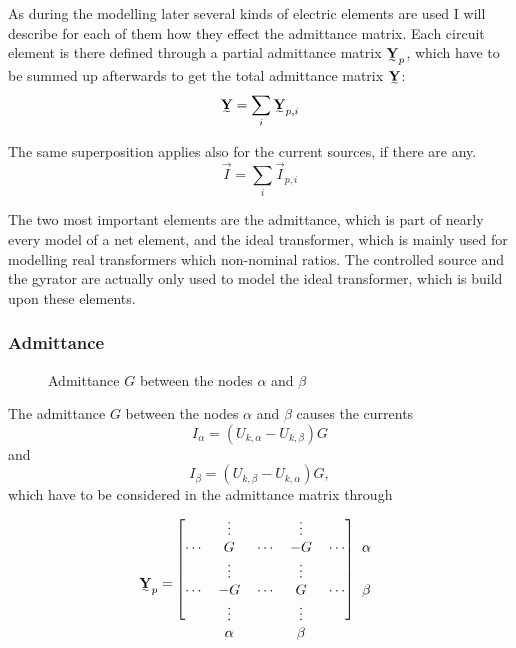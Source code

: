 As during the modelling later several kinds of electric elements are used I will describe for each of them how they effect the admittance matrix. Each circuit element is there defined through a partial admittance matrix $\mat Y_p$, which have to be summed up afterwards to get the total admittance matrix $\mat Y$:
\begin{equation}
	\mat Y = \sum_i \mat Y_{p,i}
\end{equation}

The same superposition applies also for the current sources, if there are any.
\begin{equation}
	\vec I = \sum_i \vec I_{p,i}
\end{equation}

The two most important elements are the admittance, which is part of nearly every model of a net element, and the ideal transformer, which is mainly used for modelling real transformers which non-nominal ratios. The controlled source and the gyrator are actually only used to model the ideal transformer, which is build upon these elements.

\subsubsection{Admittance}

\begin{figure}
	\centering
	
	\caption{Admittance $G$ between the nodes $\alpha$ and $\beta$}
	\label{fig:admittance}
\end{figure}

The admittance $G$ between the nodes $\alpha$ and $\beta$  causes the currents
\begin{equation}
	I_\alpha = (U_{k,\alpha} - U_{k,\beta}) G
\end{equation}
and
\begin{equation}
	I_\beta = (U_{k,\beta} - U_{k,\alpha}) G,
\end{equation}
which have to be considered in the admittance matrix through
\begin{equation}
	\mat Y_p = 	
	\begin{blockarray}{cccccc}
		\begin{block}{[ccccc]c}
		 		& \vdots	&			& \vdots	&			& \\
		\cdots	& G			& \cdots	& -G		& \cdots	& \alpha \\
		 		& \vdots	&			& \vdots	&			& \\
		\cdots	& -G		& \cdots	& G			& \cdots	& \beta \\
		 		& \vdots	&			& \vdots	&			& \\
		\end{block}
				& \alpha	&			& \beta		&			& 
	\end{blockarray}
\end{equation}

